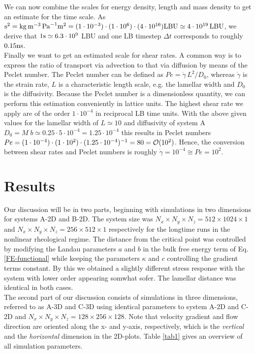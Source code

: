 \documentclass[8.5pt,twoside,twocolumn]{article}
\newcommand{\e}[1]{\cdot10^{#1}}
\newcommand{\gd}{\dot{\gamma}}
\begin{document}
We can now combine the scales for energy density, length and mass density to get an estimate for the time scale.
As ${\rm s}^2=\rm{kg}\, \rm{m}^{-3}\, \rm{Pa}^{-1}\rm{m}^2=(1\e{-3}) \cdot (1\e{6}) \cdot (4\e{16})\rm{LBU}\simeq4\e{19} \,{\rm LBU}$, we derive that $1 \rm{s}\simeq6.3\e{9}$ LBU and one LB timestep $\Delta t$ corresponds to roughly $0.15 \rm{ns}$.\\
Finally we want to get an estimated scale for shear rates. 
A common way is to express the ratio of transport via advection to that via diffusion by means of the Peclet number.
The Peclet number can be defined as $Pe=\gd\, L^2/D_0$, whereas $\gd$ is the strain rate, $L$ is a characteristic length scale, e.g. the lamellar width and $D_0$ is the diffusivity.
Because the Peclet number is a dimensionless quantity, we can perform this estimation conveniently in lattice units.
The highest shear rate we apply are of the order $1\e{-4}$ in reciprocal LB time units.
With the above given values for the lamellar width of $L\simeq10$ and diffusivity of system A $D_0=M\;b\simeq 0.25 \cdot 5\e{-4}=1.25\e{-4}$ this results in Peclet numbers $Pe=(1\e{-4})\cdot(1\e{2})\cdot(1.25\e{-4})^{-1}=80={\cal O}(10^2)$.
Hence, the conversion between shear rates and Peclet numbers is roughly $\gd=10^{-4}\cong Pe=10^2$.


\section{Results}

Our discussion will be in two parts, beginning with simulations in two dimensions for systems A-2D and B-2D.
The system size was $N_x\times N_y\times N_z=512\times 1024\times 1$ and $N_x \times N_y \times N_z=256\times512\times 1$ respectively for the longtime runs in the nonlinear rheological regime.
The distance from the critical point was controlled by modifying the Landau parameters $a$ and $b$ in the bulk free energy term of Eq. \ref{FE-functional} while keeping the parameters $\kappa$ and $c$ controlling the gradient terms constant.
By this we obtained a slightly different stress response with the system with lower order appearing somwhat sofer.
The lamellar distance was identical in both cases.\\
The second part of our discussion consists of simulations in three dimensions, referred to as A-3D and C-3D using identical parameters to system A-2D and C-2D and $N_x\times N_y\times N_z=128\times256\times128$.
Note that velocity gradient and flow direction are oriented along the x- and y-axis, respectively, which is the {\it vertical} and the {\it horizontal} dimension in the 2D-plots. 
Table \ref{tab1} gives an overview of all simulation parameters.
\end{document}

